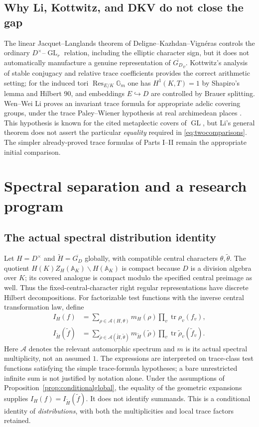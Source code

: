 \documentclass[11pt]{article}
\newcommand{\A}{\mathbb A}
\newcommand{\GL}{\operatorname{GL}}
\newcommand{\GDb}{\overline{G_D}}
\theoremstyle{plain}
\theoremstyle{definition}
\begin{document}
\subsection{Why Li, Kottwitz, and DKV do not close the gap}\label{subsec:litroute}
The linear Jacquet--Langlands theorem of
Deligne--Kazhdan--Vign\'eras \cite{DKV} controls the ordinary
$D^\times$--$\GL_r$ relation, including the elliptic character
sign, but it does not automatically manufacture a genuine
representation of $\GDb_v$.  Kottwitz's analysis of stable
conjugacy and relative trace coefficients \cite{Kottwitz84}
provides the correct arithmetic setting; for the induced tori
$\operatorname{Res}_{E/K}\mathbb G_m$ one has
$H^1(K,T)=1$ by Shapiro's lemma and Hilbert 90, and embeddings
$E\hookrightarrow D$ are controlled by Brauer splitting.
Wen--Wei Li proves an invariant trace formula for appropriate
adelic covering groups, under the trace Paley--Wiener hypothesis
at real archimedean places \cite{Li14}.  This hypothesis is known
for the cited metaplectic covers of $\GL$, but Li's general theorem
does not assert the particular \emph{equality} required in
\eqref{eq:twocomparisons}.  The simpler already-proved trace formulas
of Parts I--II remain the appropriate initial comparison.

\section{Spectral separation and a research program}\label{sec:spectral}
\subsection{The actual spectral distribution identity}
Let $H=D^\times$ and $\widetilde H=\GDb$ globally, with
compatible central characters $\theta,\widetilde\theta$.
The quotient $H(K)Z_H(\A_K)\backslash H(\A_K)$ is compact
because $D$ is a division algebra over $K$; its covered analogue
is compact modulo the specified central preimage as well.
Thus the fixed-central-character right regular representations
have discrete Hilbert decompositions.  For factorizable test
functions with the inverse central transformation law, define
\begin{align}
 I_H(f)&=\sum_{\rho\in\mathcal A(H,\theta)}
       m_H(\rho)\prod_v\operatorname{tr}\rho_v(f_v),\\
 I_{\widetilde H}(\widetilde f)
     &=\sum_{\widetilde\rho\in\mathcal A(\widetilde H,\widetilde\theta)}
       m_{\widetilde H}(\widetilde\rho)
       \prod_v\operatorname{tr}\widetilde\rho_v(\widetilde f_v).
       \label{eq:spectralglobal}
\end{align}
Here $\mathcal A$ denotes the relevant automorphic spectrum
and $m$ is its actual spectral multiplicity, not an assumed $1$.
The expressions are interpreted on trace-class test functions
satisfying the simple trace-formula hypotheses; a bare
unrestricted infinite sum is not justified by notation alone.
Under the assumptions of Proposition~\ref{prop:conditionalglobal},
the equality of the geometric expansions supplies
$I_H(f)=I_{\widetilde H}(\widetilde f)$.  It does not
identify summands.  This is a conditional identity of
\emph{distributions}, with both the multiplicities and local
trace factors retained.
\end{document}
